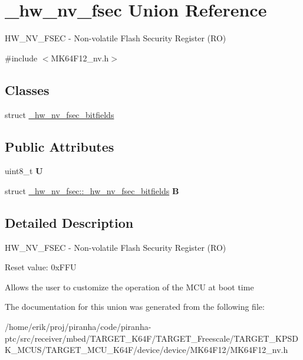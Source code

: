 \hypertarget{union__hw__nv__fsec}{}\section{\+\_\+hw\+\_\+nv\+\_\+fsec Union Reference}
\label{union__hw__nv__fsec}


H\+W\+\_\+\+N\+V\+\_\+\+F\+S\+EC -\/ Non-\/volatile Flash Security Register (RO)  




{\ttfamily \#include $<$M\+K64\+F12\+\_\+nv.\+h$>$}

\subsection*{Classes}
\begin{DoxyCompactItemize}
\item 
struct \hyperlink{struct__hw__nv__fsec_1_1__hw__nv__fsec__bitfields}{\+\_\+hw\+\_\+nv\+\_\+fsec\+\_\+bitfields}
\end{DoxyCompactItemize}
\subsection*{Public Attributes}
\begin{DoxyCompactItemize}
\item 
uint8\+\_\+t {\bfseries U}\hypertarget{union__hw__nv__fsec_a78eaabf0bf1a3a9181bb4ff98bf22ac9}{}\label{union__hw__nv__fsec_a78eaabf0bf1a3a9181bb4ff98bf22ac9}

\item 
struct \hyperlink{struct__hw__nv__fsec_1_1__hw__nv__fsec__bitfields}{\+\_\+hw\+\_\+nv\+\_\+fsec\+::\+\_\+hw\+\_\+nv\+\_\+fsec\+\_\+bitfields} {\bfseries B}\hypertarget{union__hw__nv__fsec_aa021e897750dbc922b812c7191285c1c}{}\label{union__hw__nv__fsec_aa021e897750dbc922b812c7191285c1c}

\end{DoxyCompactItemize}


\subsection{Detailed Description}
H\+W\+\_\+\+N\+V\+\_\+\+F\+S\+EC -\/ Non-\/volatile Flash Security Register (RO) 

Reset value\+: 0x\+F\+FU

Allows the user to customize the operation of the M\+CU at boot time 

The documentation for this union was generated from the following file\+:\begin{DoxyCompactItemize}
\item 
/home/erik/proj/piranha/code/piranha-\/ptc/src/receiver/mbed/\+T\+A\+R\+G\+E\+T\+\_\+\+K64\+F/\+T\+A\+R\+G\+E\+T\+\_\+\+Freescale/\+T\+A\+R\+G\+E\+T\+\_\+\+K\+P\+S\+D\+K\+\_\+\+M\+C\+U\+S/\+T\+A\+R\+G\+E\+T\+\_\+\+M\+C\+U\+\_\+\+K64\+F/device/device/\+M\+K64\+F12/M\+K64\+F12\+\_\+nv.\+h\end{DoxyCompactItemize}
